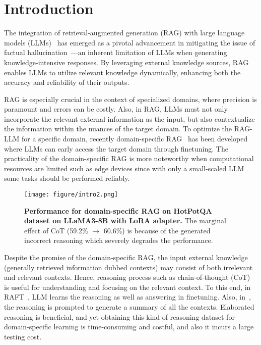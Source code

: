 \section{Introduction}

The integration of retrieval-augmented generation (RAG) with large language models (LLMs)~\cite{lewis2020retrieval} has emerged as a pivotal advancement in mitigating the issue of factual hallucination~\cite{ji2023survey}—an inherent limitation of LLMs when generating knowledge-intensive responses. By leveraging external knowledge sources, %
RAG enables LLMs to utilize relevant knowledge dynamically, enhancing both the accuracy and reliability of their outputs. 

RAG is especially crucial in the context of specialized domains, where precision is paramount and errors can be costly. Also, in RAG, LLMs must not only incorporate the relevant external information as the input, but also contextualize the information within the nuances of the target domain. To optimize the RAG-LLM for a specific domain, recently domain-specific RAG~\cite{RAFT} has been developed where LLMs can early access the target domain through finetuning. The practicality of the domain-specific RAG is more noteworthy when computational resources are limited such as edge devices since with only a small-scaled LLM some tasks should be performed reliably.
\begin{figure}[t]
    \centering
    \texttt{[image: figure/intro2.png]}
    \caption{\textbf{Performance for domain-specific RAG on HotPotQA dataset on LLaMA3-8B with LoRA adapter.} The marginal effect of CoT (59.2\% $\rightarrow$ 60.6\%) is because of the generated incorrect reasoning which severely degrades the performance.}
    \label{fig:intro}
    \vspace{-0.2cm}
\end{figure}

Despite the promise of the domain-specific RAG, the input external knowledge (generally retrieved information dubbed contexts) may consist of both irrelevant and relevant contexts. 
Hence, reasoning process such as chain-of-thought (CoT)~\cite{wei2022chain} is useful for understanding and focusing on the relevant context. To this end, in RAFT~\cite{RAFT}, LLM learns the reasoning as well as answering in finetuning. Also, in~\cite{con}, the reasoning is prompted to generate a summary of all the contexts. Elaborated reasoning is beneficial, and yet obtaining this kind of reasoning dataset for domain-specific learning is time-consuming and costful, and also it incurs a large testing cost. 

